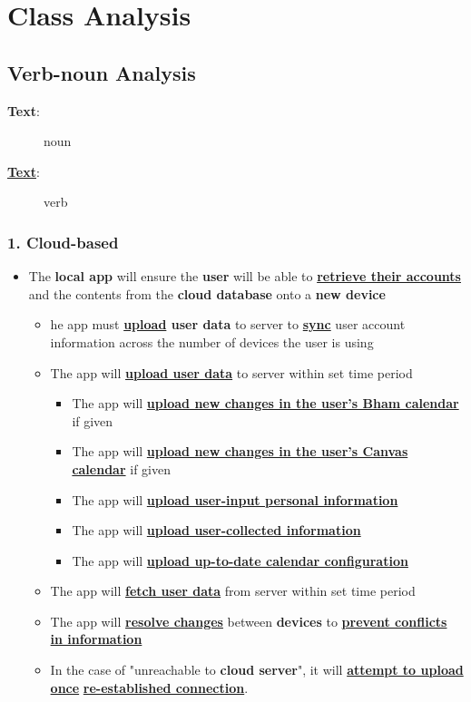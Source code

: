 \documentclass[a4paper,11pt]{article} %
\begin{document}
\section{Class Analysis}
\subsection{Verb-noun Analysis}
\begin{description}
  \item[\textbf{Text}:] noun
  \item[\textbf{\underline{Text}}:] verb
\end{description}


\subsubsection*{1. Cloud-based}
\begin{itemize}
  \item The \textbf{local app} will ensure the \textbf{user} will be able to \textbf{\underline{retrieve their accounts}} and the contents from the \textbf{cloud database} onto a \textbf{new device}
  \begin{itemize}
    \item he app must \textbf{\underline{upload} user data} to server to \textbf{\underline{sync}} user account information across the number of devices the user is using
    \item The app will \textbf{\underline{upload user data}} to server within set time period
    \begin{itemize}
      \item The app will \textbf{\underline{upload new changes in the user's Bham calendar}} if given 
      \item The app will \textbf{\underline{upload new changes in the user's Canvas calendar}} if given 
      \item The app will \textbf{\underline{upload user-input personal information}}
      \item The app will \textbf{\underline{upload user-collected information}}
      \item The app will \textbf{\underline{upload up-to-date calendar configuration}}
    \end{itemize}
    \item The app will \textbf{\underline{fetch user data}} from server within set time period
    \item The app will \textbf{\underline{resolve changes}} between \textbf{devices} to \textbf{\underline{prevent conflicts}} \\\textbf{\underline{in information}}
    \item In the case of "unreachable to \textbf{cloud server}", it will \textbf{\underline{attempt to upload once}} \textbf{\underline{re-established connection}}.
  \end{itemize}
\end{itemize}
\end{document}
